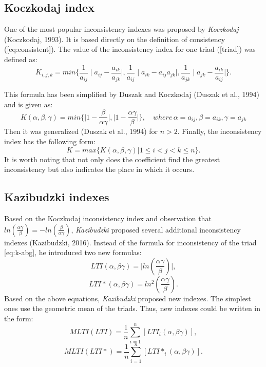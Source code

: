 \subsection{Koczkodaj index}

One of the most popular inconsistency indexes was proposed by \textit{Koczkodaj} (Koczkodaj, 1993). It is based directly on the definition of consistency ([eq:consistent]). The value of the inconsistency index for one triad ([triad]) was defined as:
	\begin{equation} 
		K_{i,j,k}=min\{\frac{1}{a_{ij}}\mid a_{ij}-\frac{a_{ik}}{a_{jk}}\mid,\frac{1}{a_{ij}}\mid a_{ik}-a_{ij}a_{jk}\mid,\frac{1}{a_{jk}}\mid a_{jk}-\frac{a_{ik}}{a_{ij}}\mid\}.
	 \end{equation}

 This formula has been simplified by Duszak and Koczkodaj (Duszak et al., 1994) and is given as:
 	\begin{equation} 
		K(\alpha,\beta,\gamma)=min\{\mid1-\frac{\beta}{\alpha\gamma}\mid,\mid1-\frac{\alpha\gamma}{\beta}\mid\},\,\,\,\,\,\,where\,\alpha=a_{ij},\beta=a_{ik},\gamma=a_{jk}
	 \end{equation}
 Then it was generalized (Duszak et al., 1994) for $n>2$. Finally, the inconsistency index has the following form:
 	\begin{equation} 
		K=max\{K(\alpha,\beta,\gamma)|1\leq i<j<k\leq n\}.
	 \end{equation}
 It is worth noting that not only does the coefficient find the greatest inconsistency but also indicates the place in which it occurs.


\subsection{Kazibudzki indexes}

Based on the Koczkodaj inconsistency index and observation that $ln(\frac{\alpha\gamma}{\beta})=-ln(\frac{\beta}{\alpha\gamma})$, \textit{Kazibudzki} proposed several additional inconsistency indexes (Kazibudzki, 2016). Instead of the formula for inconsistency of the triad [eq:k-abg], he introduced two new formulas:
	\begin{equation} 
		LTI(\alpha,\beta\gamma)=\mid ln(\frac{\alpha\gamma}{\beta})\mid,
	 \end{equation}
	\begin{equation} 
		LTI*(\alpha,\beta\gamma)=ln^{2}(\frac{\alpha\gamma}{\beta}).
	 \end{equation}
Based on the above equations, \textit{Kazibudzki} proposed new indexes. The simplest ones use the geometric mean of the triads. Thus, new indexes could be written in the form:
	\begin{equation} 
		MLTI(LTI)=\frac{1}{n}\sum_{i=1}^{n}\left[LTI_{i}(\alpha,\beta\gamma)\right],
	 \end{equation}
 	\begin{equation} 
		MLTI(LTI*)=\frac{1}{n}\sum_{i=1}^{n}\left[LTI*_{i}(\alpha,\beta\gamma)\right].
			 \end{equation}
 

